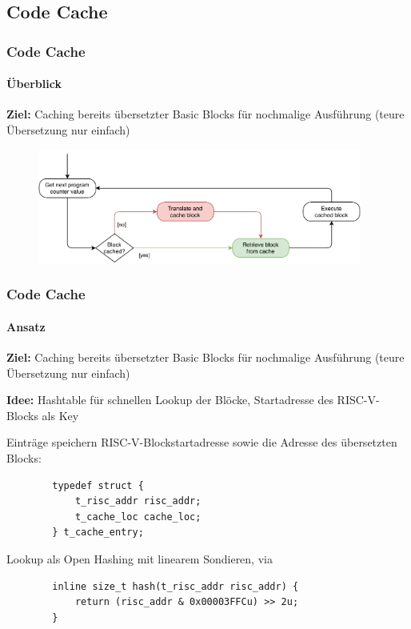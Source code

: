 \documentclass[german]{tum-presentation}
\begin{document}
\subsection{Code Cache} %
\begin{frame}
	\frametitle{Code Cache}
	\framesubtitle{Überblick}
	
	\textbf{Ziel:} Caching bereits übersetzter Basic Blocks für nochmalige Ausführung (teure Übersetzung nur einfach)
	
	\pause
	\begin{figure}
		\includegraphics[width=0.95\textwidth]{diagrams/cache-flow}
	\end{figure}
\end{frame}

\begin{frame}[fragile]
	\frametitle{Code Cache}
	\framesubtitle{Ansatz}
	
	\textbf{Ziel:} Caching bereits übersetzter Basic Blocks für nochmalige Ausführung (teure Übersetzung nur einfach)
	
	\textbf{Idee:} Hashtable für schnellen Lookup der Blöcke, Startadresse des RISC-V-Blocks als Key
	
	\vspace{0.5cm}
	\pause
	Einträge speichern RISC-V-Blockstartadresse sowie die Adresse des übersetzten Blocks:
	\begin{lstlisting}
		typedef struct {
			t_risc_addr risc_addr;
			t_cache_loc cache_loc;
		} t_cache_entry;
	\end{lstlisting}
	
	\pause
	Lookup als Open Hashing mit linearem Sondieren, via
	\begin{lstlisting}
		inline size_t hash(t_risc_addr risc_addr) {
			return (risc_addr & 0x00003FFCu) >> 2u;
		}
	\end{lstlisting}
\end{frame}
\end{document}
